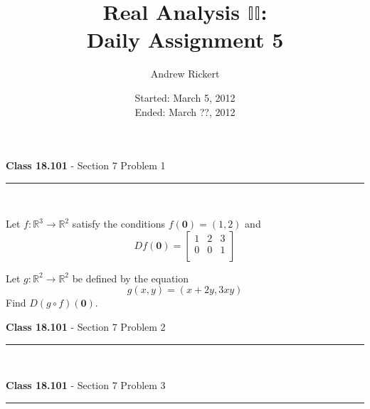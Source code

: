 \documentclass[11pt,reqno]{article}
\title{Real Analysis $\mathbb{II}$: \\ Daily Assignment 5}
\author{Andrew Rickert}
\date{Started: March 5, 2012 \\ \hspace{1pt} Ended: March ??,  2012}                                           %
\begin{document}
\maketitle

\begin{flushleft} 
\textbf{Class 18.101} - Section 7 Problem 1\\
\rule{500pt}{1pt}\\
\end{flushleft} 

\noindent Let $f : \mathbb{R}^3 \to \mathbb{R}^2$ satisfy the conditions $f(\textbf{0}) = (1,2)$ and 
\[ D f(\textbf{0}) = \left[ \begin{array}{ccc}
1 & 2 & 3 \\
0 & 0 & 1\\
\end{array} \right] \]

\noindent Let $g : \mathbb{R}^2 \to \mathbb{R}^2$ be defined by the equation
\[ g(x,y) = (x + 2 y, 3 x y) \]
\noindent Find $D(g \circ f)(\textbf{0})$.

\begin{flushleft} 
\textbf{Class 18.101} - Section 7 Problem 2\\
\rule{500pt}{1pt}\\
\end{flushleft} 



\begin{flushleft} 
\textbf{Class 18.101} - Section 7 Problem 3\\
\rule{500pt}{1pt}\\
\end{flushleft} 
\end{document}

